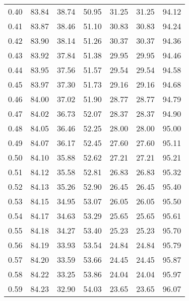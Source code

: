 \begin{tabular}{|c|c|c|c|c|c|c|}
      0.40 &     83.84 &     38.74 &      50.95 &   31.25 &      31.25 &         94.12 \\
      0.41 &     83.87 &     38.46 &      51.10 &   30.83 &      30.83 &         94.24 \\
      0.42 &     83.90 &     38.14 &      51.26 &   30.37 &      30.37 &         94.36 \\
      0.43 &     83.92 &     37.84 &      51.38 &   29.95 &      29.95 &         94.46 \\
      0.44 &     83.95 &     37.56 &      51.57 &   29.54 &      29.54 &         94.58 \\
      0.45 &     83.97 &     37.30 &      51.73 &   29.16 &      29.16 &         94.68 \\
      0.46 &     84.00 &     37.02 &      51.90 &   28.77 &      28.77 &         94.79 \\
      0.47 &     84.02 &     36.73 &      52.07 &   28.37 &      28.37 &         94.90 \\
      0.48 &     84.05 &     36.46 &      52.25 &   28.00 &      28.00 &         95.00 \\
      0.49 &     84.07 &     36.17 &      52.45 &   27.60 &      27.60 &         95.11 \\
      0.50 &     84.10 &     35.88 &      52.62 &   27.21 &      27.21 &         95.21 \\
      0.51 &     84.12 &     35.58 &      52.81 &   26.83 &      26.83 &         95.32 \\
      0.52 &     84.13 &     35.26 &      52.90 &   26.45 &      26.45 &         95.40 \\
      0.53 &     84.15 &     34.95 &      53.07 &   26.05 &      26.05 &         95.50 \\
      0.54 &     84.17 &     34.63 &      53.29 &   25.65 &      25.65 &         95.61 \\
      0.55 &     84.18 &     34.27 &      53.40 &   25.23 &      25.23 &         95.70 \\
      0.56 &     84.19 &     33.93 &      53.54 &   24.84 &      24.84 &         95.79 \\
      0.57 &     84.20 &     33.59 &      53.66 &   24.45 &      24.45 &         95.87 \\
      0.58 &     84.22 &     33.25 &      53.86 &   24.04 &      24.04 &         95.97 \\
      0.59 &     84.23 &     32.90 &      54.03 &   23.65 &      23.65 &         96.07 \\

\end{tabular}
